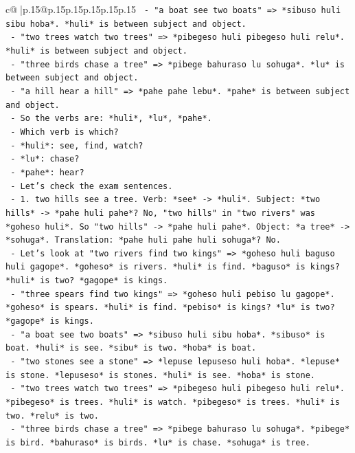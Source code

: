 \documentclass{article}
\begin{document}
{\begin{supertabular}{c@{$\;$}|p{.15\linewidth}@{}p{.15\linewidth}p{.15\linewidth}p{.15\linewidth}p{.15\linewidth}p{.15\linewidth}}
{{{\texttt{      {-} "a boat see two boats" => *sibuso huli sibu hoba*. *huli* is between subject and object.} \\
\texttt{      {-} "two trees watch two trees" => *pibegeso huli pibegeso huli relu*. *huli* is between subject and object.} \\
\texttt{      {-} "three birds chase a tree" => *pibege bahuraso lu sohuga*. *lu* is between subject and object.} \\
\texttt{      {-} "a hill hear a hill" => *pahe pahe lebu*. *pahe* is between subject and object.} \\
\texttt{      {-} So the verbs are: *huli*, *lu*, *pahe*.} \\
\texttt{      {-} Which verb is which?} \\
\texttt{        {-} *huli*: see, find, watch?} \\
\texttt{        {-} *lu*: chase?} \\
\texttt{        {-} *pahe*: hear?} \\
\texttt{      {-} Let's check the exam sentences.} \\
\texttt{        {-} 1. two hills see a tree. Verb: *see* {-}> *huli*. Subject: *two hills* {-}> *pahe huli pahe*? No, "two hills" in "two rivers" was *goheso huli*. So "two hills" {-}> *pahe huli pahe*. Object: *a tree* {-}> *sohuga*. Translation: *pahe huli pahe huli sohuga*? No.} \\
\texttt{        {-} Let's look at "two rivers find two kings" => *goheso huli baguso huli gagope*. *goheso* is rivers. *huli* is find. *baguso* is kings? *huli* is two? *gagope* is kings.} \\
\texttt{        {-} "three spears find two kings" => *goheso huli pebiso lu gagope*. *goheso* is spears. *huli* is find. *pebiso* is kings? *lu* is two? *gagope* is kings.} \\
\texttt{        {-} "a boat see two boats" => *sibuso huli sibu hoba*. *sibuso* is boat. *huli* is see. *sibu* is two. *hoba* is boat.} \\
\texttt{        {-} "two stones see a stone" => *lepuse lepuseso huli hoba*. *lepuse* is stone. *lepuseso* is stones. *huli* is see. *hoba* is stone.} \\
\texttt{        {-} "two trees watch two trees" => *pibegeso huli pibegeso huli relu*. *pibegeso* is trees. *huli* is watch. *pibegeso* is trees. *huli* is two. *relu* is two.} \\
\texttt{        {-} "three birds chase a tree" => *pibege bahuraso lu sohuga*. *pibege* is bird. *bahuraso* is birds. *lu* is chase. *sohuga* is tree.} \\
}}}
\end{supertabular}}
\end{document}
